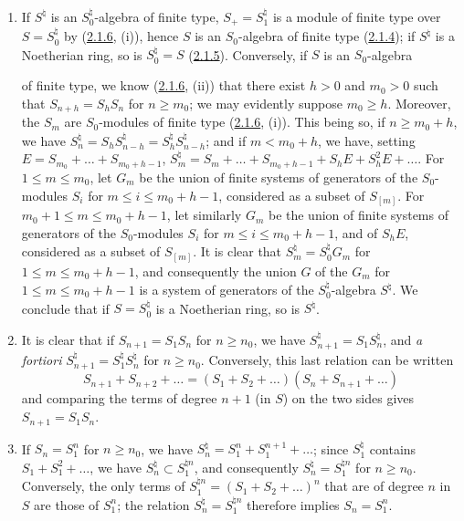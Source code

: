 \begin{enumerate}
\item[\rm(i)] If $S^\natural$ is an $S_0^\natural$-algebra of finite type,
$S_+=S_1^\natural$ is a module of finite type over $S=S_0^\natural$ by
(\hyperref[II.2.1.6]{2.1.6}, (i)), hence $S$ is an $S_0$-algebra of finite
type (\hyperref[II.2.1.4]{2.1.4}); if $S^\natural$ is a Noetherian
ring, so is $S_0^\natural=S$
(\hyperref[II.2.1.5]{2.1.5}). Conversely, if $S$ is an $S_0$-algebra

of finite type, we know (\hyperref[II.2.1.6]{2.1.6}, (ii)) that there exist
$h>0$ and $m_0>0$ such that $S_{n+h}=S_hS_n$ for $n\geq m_0$; we may
evidently suppose $m_0\geq h$. Moreover, the $S_m$ are $S_0$-modules
of finite type (\hyperref[II.2.1.6]{2.1.6}, (i)). This being so, if
$n\geq m_0+h$, we have $S_n^\natural=S_hS_{n-h}^\natural
=S_h^\natural S_{n-h}^\natural$; and if $m<m_0+h$, we have, setting
$E=S_{m_0}+\ldots+S_{m_0+h-1}$, $S_m^\natural=S_m+\ldots+S_{m_0+h-1}+S_hE+S_h^2E+\ldots$.
For $1\leq m\leq m_0$, let $G_m$ be the union of finite systems of
generators of the $S_0$-modules $S_i$ for $m\leq i\leq m_0+h-1$,
considered as a subset of $S_{[m]}$. For $m_0+1\leq m\leq m_0+h-1$, let
similarly $G_m$ be the union of finite systems of generators of the $S_0$-modules
$S_i$ for $m\leq i\leq m_0+h-1$, and of $S_hE$, considered as a subset of
$S_{[m]}$. It is clear that $S_m^\natural=S_0^\natural G_m$ for
$1\leq m\leq m_0+h-1$, and consequently the union $G$ of the $G_m$ for
$1\leq m\leq m_0+h-1$ is a system of generators of the
$S_0^\natural$-algebra $S^\natural$. We conclude that if $S=S_0^\natural$
is a Noetherian ring, so is $S^\natural$.

\item[\rm(ii)] It is clear that if $S_{n+1}=S_1S_n$ for $n\geq n_0$, we have
$S_{n+1}^\natural=S_1S_n^\natural$, and \emph{a fortiori}
$S_{n+1}^\natural=S_1^\natural S_n^\natural$ for $n\geq n_0$.
Conversely, this last relation can be written
\[
  S_{n+1}+S_{n+2}+\ldots=(S_1+S_2+\ldots)(S_n+S_{n+1}+\ldots)
\]
and comparing the terms of degree $n+1$ (in $S$) on the two sides gives
$S_{n+1}=S_1S_n$.

\item[\rm(iii)] If $S_n=S_1^n$ for $n\geq n_0$, we have
$S_n^\natural=S_1^n+S_1^{n+1}+\ldots$; since $S_1^\natural$ contains
$S_1+S_1^2+\ldots$, we have $S_n^\natural\subset S_1^{\natural n}$, and consequently
$S_n^\natural=S_1^{\natural n}$ for $n\geq n_0$. Conversely, the only
terms of $S_1^{\natural n}=(S_1+S_2+\ldots)^n$ that are of degree $n$ in
$S$ are those of $S_1^n$; the relation $S_n^\natural=S_1^{\natural n}$
therefore implies $S_n=S_1^n$.


\end{enumerate}
